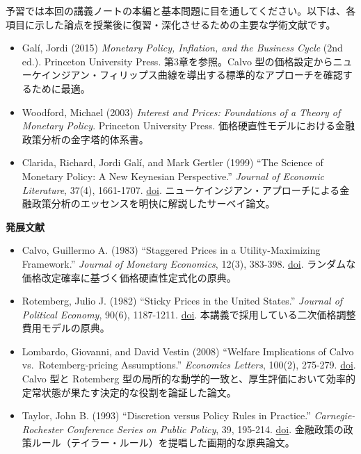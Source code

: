 \documentclass[
  japanese,
  lualatex,
  ja=standard,
  12pt,
  a4paper]{ltjsarticle}
\providecommand{\tightlist}{%
  \setlength{\itemsep}{0pt}\setlength{\parskip}{0pt}}
\begin{document}
予習では本回の講義ノートの本編と基本問題に目を通してください。以下は、各項目に示した論点を授業後に復習・深化させるための主要な学術文献です。

\begin{itemize}
\tightlist
\item
  Galí, Jordi (2015) \emph{Monetary Policy, Inflation, and the Business
  Cycle} (2nd ed.). Princeton University Press. 第3章を参照。Calvo
  型の価格設定からニューケインジアン・フィリップス曲線を導出する標準的なアプローチを確認するために最適。
\item
  Woodford, Michael (2003) \emph{Interest and Prices: Foundations of a
  Theory of Monetary Policy}. Princeton University Press.
  価格硬直性モデルにおける金融政策分析の金字塔的体系書。
\item
  Clarida, Richard, Jordi Galí, and Mark Gertler (1999) ``The Science of
  Monetary Policy: A New Keynesian Perspective.'' \emph{Journal of
  Economic Literature}, 37(4), 1661-1707.
  \href{https://doi.org/10.1257/jel.37.4.1661}{doi}.
  ニューケインジアン・アプローチによる金融政策分析のエッセンスを明快に解説したサーベイ論文。
\end{itemize}

\Needspace{0.30\textheight}

\textbf{発展文献}

\begin{itemize}
\tightlist
\item
  Calvo, Guillermo A. (1983) ``Staggered Prices in a Utility-Maximizing
  Framework.'' \emph{Journal of Monetary Economics}, 12(3), 383-398.
  \href{https://doi.org/10.1016/0304-3932(83)90060-0}{doi}.
  ランダムな価格改定確率に基づく価格硬直性定式化の原典。
\item
  Rotemberg, Julio J. (1982) ``Sticky Prices in the United States.''
  \emph{Journal of Political Economy}, 90(6), 1187-1211.
  \href{https://doi.org/10.1086/261117}{doi}.
  本講義で採用している二次価格調整費用モデルの原典。
\item
  Lombardo, Giovanni, and David Vestin (2008) ``Welfare Implications of
  Calvo vs.~Rotemberg-pricing Assumptions.'' \emph{Economics Letters},
  100(2), 275-279.
  \href{https://doi.org/10.1016/j.econlet.2008.02.008}{doi}. Calvo 型と
  Rotemberg
  型の局所的な動学的一致と、厚生評価において効率的定常状態が果たす決定的な役割を論証した論文。
\item
  Taylor, John B. (1993) ``Discretion versus Policy Rules in Practice.''
  \emph{Carnegie-Rochester Conference Series on Public Policy}, 39,
  195-214. \href{https://doi.org/10.1016/0167-2231(93)90009-L}{doi}.
  金融政策の政策ルール（テイラー・ルール）を提唱した画期的な原典論文。
\end{itemize}
\end{document}
